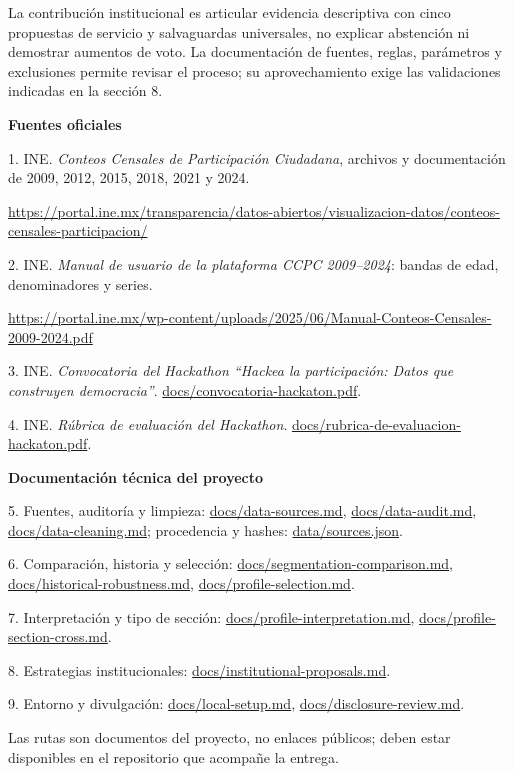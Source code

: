 \documentclass[11pt]{article}
\begin{document}
La contribución institucional es articular evidencia descriptiva con cinco propuestas de servicio y salvaguardas universales, no explicar abstención ni demostrar aumentos de voto. La documentación de fuentes, reglas, parámetros y exclusiones permite revisar el proceso; su aprovechamiento exige las validaciones indicadas en la sección 8.

\textbf{Fuentes oficiales}

1. INE. \textit{Conteos Censales de Participación Ciudadana}, archivos y documentación de 2009, 2012, 2015, 2018, 2021 y 2024.\par
\url{https://portal.ine.mx/transparencia/datos-abiertos/visualizacion-datos/conteos-censales-participacion/}

2. INE. \textit{Manual de usuario de la plataforma CCPC 2009--2024}: bandas de edad, denominadores y series.\par
\url{https://portal.ine.mx/wp-content/uploads/2025/06/Manual-Conteos-Censales-2009-2024.pdf}

3. INE. \textit{Convocatoria del Hackathon ``Hackea la participación: Datos que construyen democracia''}. \url{docs/convocatoria-hackaton.pdf}.

4. INE. \textit{Rúbrica de evaluación del Hackathon}. \url{docs/rubrica-de-evaluacion-hackaton.pdf}.

\textbf{Documentación técnica del proyecto}

5. Fuentes, auditoría y limpieza: \url{docs/data-sources.md}, \url{docs/data-audit.md}, \url{docs/data-cleaning.md}; procedencia y hashes: \url{data/sources.json}.

6. Comparación, historia y selección: \url{docs/segmentation-comparison.md}, \url{docs/historical-robustness.md}, \url{docs/profile-selection.md}.

7. Interpretación y tipo de sección: \url{docs/profile-interpretation.md}, \url{docs/profile-section-cross.md}.

8. Estrategias institucionales: \url{docs/institutional-proposals.md}.

9. Entorno y divulgación: \url{docs/local-setup.md}, \url{docs/disclosure-review.md}.

Las rutas son documentos del proyecto, no enlaces públicos; deben estar disponibles en el repositorio que acompañe la entrega.
\end{document}
